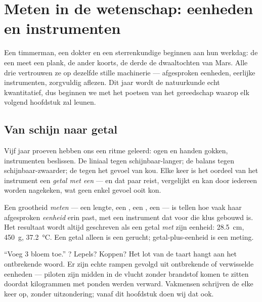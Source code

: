\chapter{Meten in de wetenschap: eenheden en instrumenten}\label{ch:g6:measurement-in-science}

Een timmerman, een dokter en een sterrenkundige beginnen aan hun
werkdag: de een meet een plank, de ander koorts, de derde de
dwaaltochten van Mars. Alle drie vertrouwen ze op dezelfde stille
machinerie --- afgesproken eenheden, eerlijke instrumenten,
zorgvuldig aflezen. Dit jaar wordt de natuurkunde echt kwantitatief,
dus beginnen we met het poetsen van het gereedschap waarop elk volgend
hoofdstuk zal leunen.

\section{Van schijn naar getal}

Vijf jaar proeven hebben ons een ritme geleerd: ogen en handen gokken,
instrumenten beslissen. De liniaal tegen schijnbaar-langer; de balans
tegen schijnbaar-zwaarder; de  tegen het gevoel van kou. Elke
keer is het oordeel van het instrument een \emph{getal met een
} --- en dat paar reist, vergelijkt en kan door iedereen
worden nagekeken, wat geen enkel gevoel ooit kon.

\begin{definition}\label{def:g6:measurement-in-science:measuring}
Een grootheid \emph{meten} --- een lengte, een
, een , een  --- is tellen hoe vaak haar
afgesproken \emph{eenheid} erin past, met een
instrument dat voor die klus gebouwd is. Het resultaat wordt altijd
geschreven als een getal \emph{met} zijn eenheid: \qty{28.5}{cm},
\qty{450}{g}, \qty{37.2}{\celsius}. Een getal alleen is een gerucht;
getal-plus-eenheid is een meting.
\end{definition}

\begin{example}\label{ex:g6:measurement-in-science:missing}
``Voeg 3 bloem toe.'' ? Lepels? Koppen? Het lot van de taart hangt
aan het ontbrekende woord. Er zijn echte rampen gevolgd uit
ontbrekende of verwisselde eenheden --- piloten zijn midden in de vlucht
zonder brandstof komen te zitten doordat kilogrammen met ponden
werden verward. Vakmensen schrijven de  elke keer op, zonder
uitzondering; vanaf dit hoofdstuk doen wij dat ook.
\end{example}

